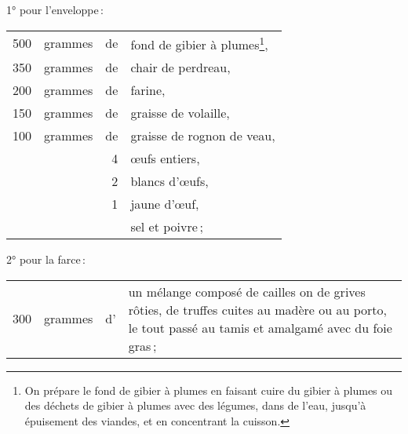 \medskip

1° pour l'enveloppe :

\footnotesize
\begin{longtable}{rrrp{16em}}
    500 & grammes & de & fond de gibier à plumes\footnote{On prépare le fond de gibier à plumes
                                                  en faisant cuire du gibier à plumes ou des déchets
                                                  de gibier à plumes avec des légumes, dans de l'eau,
                                                  jusqu'à épuisement des viandes, et en concentrant la
                                                  cuisson.},                                              \\
    350 & grammes & de & chair de perdreau,                                                               \\
    200 & grammes & de & farine,                                                                          \\
    150 & grammes & de & graisse de volaille,                                                             \\
    100 & grammes & de & graisse de rognon de veau,                                                       \\
        &         &  4 & œufs entiers,                                                                    \\
        &         &  2 & blancs d'œufs,                                                                   \\
        &         &  1 & jaune d'œuf,                                                                     \\
        &         &    & sel et poivre ;                                                                  \\
\end{longtable}
\normalsize

2° pour la farce :

\footnotesize
\begin{longtable}{rrrp{16em}}
    300 & grammes & d' & un mélange composé de cailles on de grives rôties, de truffes
                         cuites au madère ou au porto, le tout passé au tamis et amalgamé
                         avec du foie gras ;                                                              \\
\end{longtable}
\normalsize

